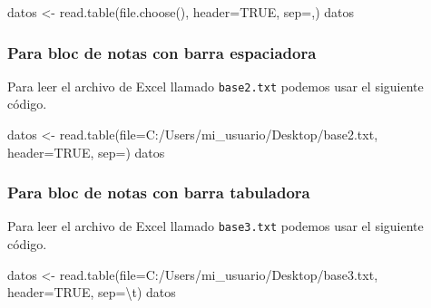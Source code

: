 \documentclass[
]{book}
\makeatletter
\newenvironment{Shaded}{\begin{snugshade}}{\end{snugshade}}
\newcommand{\AttributeTok}[1]{\textcolor[rgb]{0.77,0.63,0.00}{#1}}
\newcommand{\ConstantTok}[1]{\textcolor[rgb]{0.00,0.00,0.00}{#1}}
\newcommand{\FunctionTok}[1]{\textcolor[rgb]{0.00,0.00,0.00}{#1}}
\newcommand{\NormalTok}[1]{#1}
\newcommand{\OtherTok}[1]{\textcolor[rgb]{0.56,0.35,0.01}{#1}}
\newcommand{\SpecialCharTok}[1]{\textcolor[rgb]{0.00,0.00,0.00}{#1}}
\newcommand{\StringTok}[1]{\textcolor[rgb]{0.31,0.60,0.02}{#1}}
\newenvironment{kframe}{%
\medskip{}
\setlength{\fboxsep}{.8em}
 \def\at@end@of@kframe{}%
 \ifinner\ifhmode%
  \def\at@end@of@kframe{\end{minipage}}%
  \begin{minipage}{\columnwidth}%
 \fi\fi%
 \def\FrameCommand##1{\hskip\@totalleftmargin \hskip-\fboxsep
 \colorbox{shadecolor}{##1}\hskip-\fboxsep
     \hskip-\linewidth \hskip-\@totalleftmargin \hskip\columnwidth}%
 \MakeFramed {\advance\hsize-\width
   \@totalleftmargin\z@ \linewidth\hsize
   \@setminipage}}%
 {\par\unskip\endMakeFramed%
 \at@end@of@kframe}
\renewenvironment{Shaded}{\begin{kframe}}{\end{kframe}}
\makeatother
\begin{document}
\begin{Shaded}
\begin{Highlighting}[]
\NormalTok{datos }\OtherTok{\textless{}{-}} \FunctionTok{read.table}\NormalTok{(}\FunctionTok{file.choose}\NormalTok{(), }\AttributeTok{header=}\ConstantTok{TRUE}\NormalTok{, }\AttributeTok{sep=}\StringTok{\textquotesingle{},\textquotesingle{}}\NormalTok{)}
\NormalTok{datos}
\end{Highlighting}
\end{Shaded}

\hypertarget{para-bloc-de-notas-con-barra-espaciadora}{%
\subsubsection*{Para bloc de notas con barra espaciadora}\label{para-bloc-de-notas-con-barra-espaciadora}}

Para leer el archivo de Excel llamado \texttt{base2.txt} podemos usar el siguiente código.

\begin{Shaded}
\begin{Highlighting}[]
\NormalTok{datos }\OtherTok{\textless{}{-}} \FunctionTok{read.table}\NormalTok{(}\AttributeTok{file=}\StringTok{\textquotesingle{}C:/Users/mi\_usuario/Desktop/base2.txt\textquotesingle{}}\NormalTok{,}
                    \AttributeTok{header=}\ConstantTok{TRUE}\NormalTok{, }\AttributeTok{sep=}\StringTok{\textquotesingle{}\textquotesingle{}}\NormalTok{)}
\NormalTok{datos}
\end{Highlighting}
\end{Shaded}

\hypertarget{para-bloc-de-notas-con-barra-tabuladora}{%
\subsubsection*{Para bloc de notas con barra tabuladora}\label{para-bloc-de-notas-con-barra-tabuladora}}

Para leer el archivo de Excel llamado \texttt{base3.txt} podemos usar el siguiente código.

\begin{Shaded}
\begin{Highlighting}[]
\NormalTok{datos }\OtherTok{\textless{}{-}} \FunctionTok{read.table}\NormalTok{(}\AttributeTok{file=}\StringTok{\textquotesingle{}C:/Users/mi\_usuario/Desktop/base3.txt\textquotesingle{}}\NormalTok{,}
                    \AttributeTok{header=}\ConstantTok{TRUE}\NormalTok{, }\AttributeTok{sep=}\StringTok{\textquotesingle{}}\SpecialCharTok{\textbackslash{}t}\StringTok{\textquotesingle{}}\NormalTok{)}
\NormalTok{datos}
\end{Highlighting}
\end{Shaded}
\end{document}
